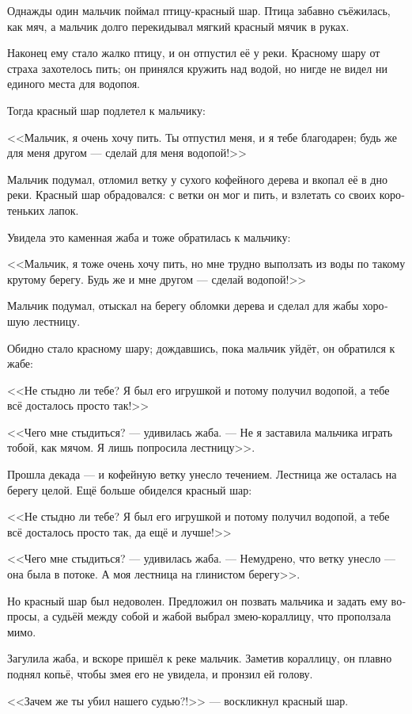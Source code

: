 \documentclass[a4paper,12pt,fleqn]{book}\usepackage{polyglossia}\setdefaultlanguage[babelshorthands=true]{russian}\setotherlanguage{english}\defaultfontfeatures{Ligatures=TeX,Mapping=tex-text}\usepackage{xcolor}\newcommand{\ml}[3]{#2}
\begin{document}
{Однажды один мальчик поймал птицу-красный шар.
Птица забавно съёжилась, как мяч, а мальчик долго перекидывал мягкий красный мячик в руках.

Наконец ему стало жалко птицу, и он отпустил её у реки.
Красному шару от страха захотелось пить;
он принялся кружить над водой, но нигде не видел ни единого места для водопоя.

Тогда красный шар подлетел к мальчику:

<<Мальчик, я очень хочу пить.
Ты отпустил меня, и я тебе благодарен;
будь же для меня другом --- сделай для меня водопой!>>

Мальчик подумал, отломил ветку у сухого кофейного дерева и вкопал её в дно реки.
Красный шар обрадовался: с ветки он мог и пить, и взлетать со своих коротеньких лапок.

Увидела это каменная жаба и тоже обратилась к мальчику:

<<Мальчик, я тоже очень хочу пить, но мне трудно выползать из воды по такому крутому берегу.
Будь же и мне другом --- сделай водопой!>>

Мальчик подумал, отыскал на берегу обломки дерева и сделал для жабы хорошую лестницу.

Обидно стало красному шару;
дождавшись, пока мальчик уйдёт, он обратился к жабе:

<<Не стыдно ли тебе?
Я был его игрушкой и потому получил водопой, а тебе всё досталось просто так!>>

<<Чего мне стыдиться? --- удивилась жаба.
--- Не я заставила мальчика играть тобой, как мячом.
Я лишь попросила лестницу>>.

Прошла декада --- и кофейную ветку унесло течением.
Лестница же осталась на берегу целой.
Ещё больше обиделся красный шар:

<<Не стыдно ли тебе?
Я был его игрушкой и потому получил водопой, а тебе всё досталось просто так, да ещё и лучше!>>

<<Чего мне стыдиться? --- удивилась жаба.
--- Немудрено, что ветку унесло --- она была в потоке.
А моя лестница на глинистом берегу>>.

Но красный шар был недоволен.
Предложил он позвать мальчика и задать ему вопросы, а судьёй между собой и жабой выбрал змею-кораллицу, что проползала мимо.

Загулила жаба, и вскоре пришёл к реке мальчик.
Заметив кораллицу, он плавно поднял копьё, чтобы змея его не увидела, и пронзил ей голову.

<<Зачем же ты убил нашего судью?!>> --- воскликнул красный шар.

}
\end{document}
